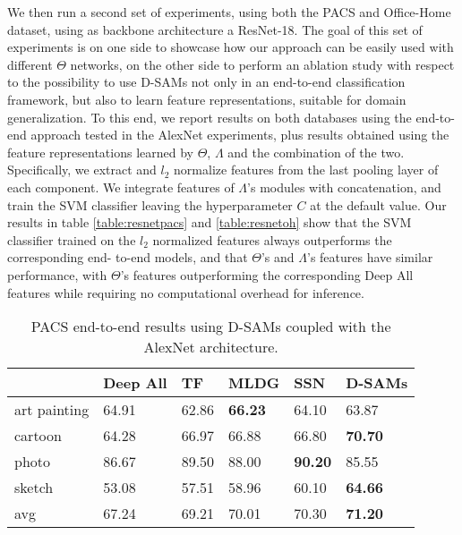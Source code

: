     We then run a second set of experiments, using both the PACS and Office-Home dataset, using as backbone architecture a ResNet-18. The goal of this set of experiments is on one side to showcase how our approach can be easily used with different $\Theta$ networks, on the other side to perform an ablation study with respect to the possibility to use D-SAMs not only in an end-to-end classification framework, but also to learn feature representations, suitable for domain generalization. To this end, we report results on both databases using the end-to-end approach tested in the AlexNet experiments, plus results obtained using the feature representations learned by $\Theta$, $\Lambda$ and the combination of the two. Specifically, we extract and $l_2$ normalize features from 
the last pooling layer of each component. We integrate features of $\Lambda$’s modules 
with concatenation, and train the SVM classifier leaving the hyperparameter $C$ 
at the default value. Our results in table \ref{table:resnetpacs} and \ref{table:resnetoh} show that the SVM classifier 
trained on the $l_2$ normalized features always outperforms the corresponding end-
 to-end models, and that $\Theta$’s and $\Lambda$’s features have similar performance, with $\Theta$’s 
 features outperforming the corresponding Deep All features while requiring no 
 computational overhead for inference. 
   
    
    
    \begin{table}
\centering
\caption{PACS end-to-end results using D-SAMs coupled with the AlexNet architecture.}
\label{table:pacs}
\begin{tabular}{p{2cm}p{2cm}p{2cm}p{2cm}p{2cm}p{2cm}}
\hline
\textbf{}    & Deep All \cite{li2017deeper} & TF \cite{li2017deeper} & MLDG \cite{MLDG_AAA18}           & SSN \cite{mancini2018best}         & D-SAMs           \\
\hline
art painting & 64.91    & 62.86        & \textbf{66.23} & 64.10          & 63.87          \\
cartoon      & 64.28    & 66.97        & 66.88          & 66.80          & \textbf{70.70} \\
photo        & 86.67    & 89.50        & 88.00          & \textbf{90.20} & 85.55          \\
sketch       & 53.08    & 57.51        & 58.96          & 60.10          & \textbf{64.66} \\
\hline
avg          & 67.24    & 69.21        & 70.01          & 70.30          & \textbf{71.20}
\end{tabular}
\end{table}

